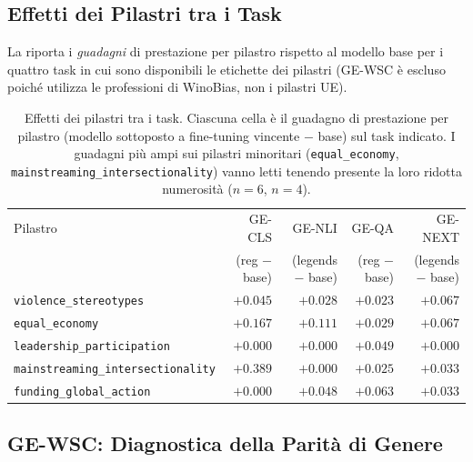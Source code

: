 \documentclass[pdflatex, sn-apa]{sn-jnl}%
\theoremstyle{thmstyleone}%
\theoremstyle{thmstyletwo}%
\theoremstyle{thmstylethree}%
\begin{document}
\subsection{Effetti dei Pilastri tra i Task}
\label{sec:results:pillars}

La  riporta i \emph{guadagni} di prestazione per pilastro
rispetto al modello base per i quattro task in cui sono disponibili le etichette
dei pilastri (GE-WSC è escluso poiché utilizza le professioni di WinoBias, non i
pilastri UE).

\begin{table}[h]
\centering
\caption{Effetti dei pilastri tra i task. Ciascuna cella è il guadagno di
prestazione per pilastro (modello sottoposto a fine-tuning vincente $-$ base) sul
task indicato. I guadagni più ampi sui pilastri minoritari
(\texttt{equal\_economy}, \texttt{mainstreaming\_intersectionality}) vanno letti
tenendo presente la loro ridotta numerosità ($n=6$, $n=4$).}
\label{tab:pillars}
\small
\begin{tabular}{@{}lrrrr@{}}
\toprule
Pilastro                              & GE-CLS        & GE-NLI        & GE-QA
& GE-NEXT       \\
                                      & (reg $-$ base)& (legends $-$ base) &
                                      (reg $-$ base) & (legends $-$ base) \\
\midrule
\texttt{violence\_stereotypes}        & $+0.045$      & $+0.028$      & $+0.023$
& $+0.067$      \\
\texttt{equal\_economy}               & $+0.167$      & $+0.111$      & $+0.029$
& $+0.067$      \\
\texttt{leadership\_participation}    & $+0.000$      & $+0.000$      & $+0.049$
& $+0.000$      \\
\texttt{mainstreaming\_intersectionality} & $+0.389$  & $+0.000$      & $+0.025$
& $+0.033$      \\
\texttt{funding\_global\_action}      & $+0.000$      & $+0.048$      & $+0.063$
& $+0.033$      \\
\bottomrule
\end{tabular}
\end{table}


\subsection{GE-WSC: Diagnostica della Parità di Genere}
\label{sec:results:wsc}
\end{document}
